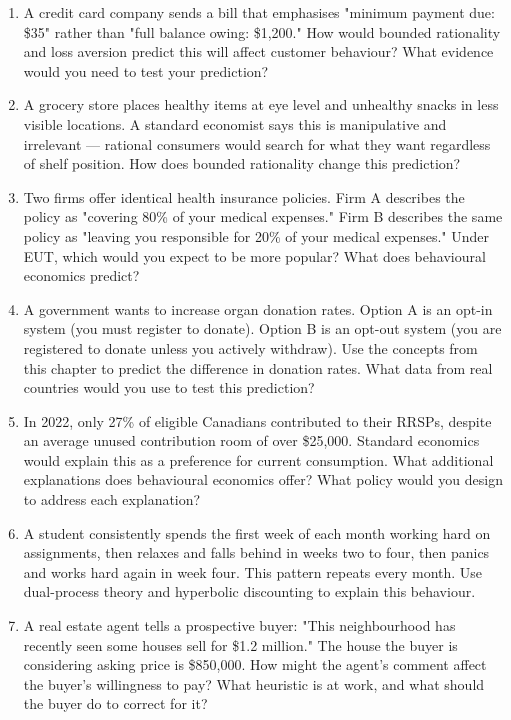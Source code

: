 \documentclass[12pt, letterpaper]{article}
\begin{document}
\begin{enumerate}
\item A credit card company sends a bill that emphasises "minimum payment due: \$35" rather than "full balance owing: \$1,200." How would bounded rationality and loss aversion predict this will affect customer behaviour? What evidence would you need to test your prediction?

\item A grocery store places healthy items at eye level and unhealthy snacks in less visible locations. A standard economist says this is manipulative and irrelevant --- rational consumers would search for what they want regardless of shelf position. How does bounded rationality change this prediction?

\item Two firms offer identical health insurance policies. Firm A describes the policy as "covering 80\% of your medical expenses." Firm B describes the same policy as "leaving you responsible for 20\% of your medical expenses." Under EUT, which would you expect to be more popular? What does behavioural economics predict?

\item A government wants to increase organ donation rates. Option A is an opt-in system (you must register to donate). Option B is an opt-out system (you are registered to donate unless you actively withdraw). Use the concepts from this chapter to predict the difference in donation rates. What data from real countries would you use to test this prediction?

\item In 2022, only 27\% of eligible Canadians contributed to their RRSPs, despite an average unused contribution room of over \$25,000. Standard economics would explain this as a preference for current consumption. What additional explanations does behavioural economics offer? What policy would you design to address each explanation?

\item A student consistently spends the first week of each month working hard on assignments, then relaxes and falls behind in weeks two to four, then panics and works hard again in week four. This pattern repeats every month. Use dual-process theory and hyperbolic discounting to explain this behaviour.

\item A real estate agent tells a prospective buyer: "This neighbourhood has recently seen some houses sell for \$1.2 million." The house the buyer is considering asking price is \$850,000. How might the agent's comment affect the buyer's willingness to pay? What heuristic is at work, and what should the buyer do to correct for it?


\end{enumerate}
\end{document}
